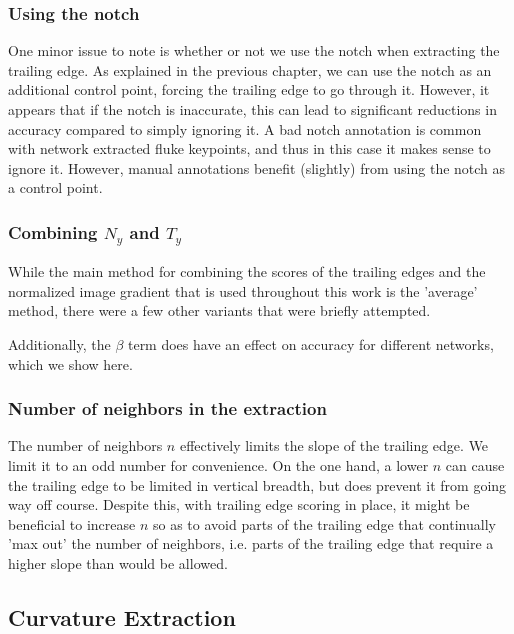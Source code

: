 \subsubsection{Using the notch}

One minor issue to note is whether or not we use the notch when extracting the trailing edge.
As explained in the previous chapter, we can use the notch as an additional control point, forcing the trailing edge to go through it.
However, it appears that if the notch is inaccurate, this can lead to significant reductions in accuracy compared to simply ignoring it.
A bad notch annotation is common with network extracted fluke keypoints, and thus in this case it makes sense to ignore it.
However, manual annotations benefit (slightly) from using the notch as a control point.


\subsubsection{Combining $N_y$ and $T_y$}

While the main method for combining the scores of the trailing edges and the normalized image gradient that is used throughout this work is the 'average' method, there were a few other variants that were briefly attempted.

Additionally, the $\beta$ term does have an effect on accuracy for different networks, which we show here. %

\subsubsection{Number of neighbors in the extraction}

The number of neighbors $n$ effectively limits the slope of the trailing edge.
We limit it to an odd number for convenience.
On the one hand, a lower $n$ can cause the trailing edge to be limited in vertical breadth, but does prevent it from going way off course.
Despite this, with trailing edge scoring in place, it might be beneficial to increase $n$ so as to avoid parts of the trailing edge that continually 'max out' the number of neighbors, i.e. parts of the trailing edge that require a higher slope than would be allowed.


\subsection{Curvature Extraction}

